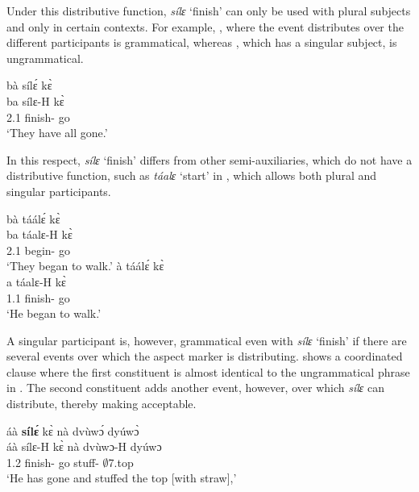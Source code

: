 Under this distributive function, {\itshape sílɛ} `finish' can only be used with plural subjects and only in certain contexts. For example, , where the event distributes over the different participants is grammatical, whereas , which has a singular subject, is ungrammatical.


\ea\label{Nsile1}
\ea  \label{Nsile11}
  \glll  bà sílɛ́ kɛ̀ \\
          ba sílɛ-H kɛ̀ \\
         2.{\PST}1 finish-{\R} go\\
    \trans `They have all gone.'
\z
\z

In this respect, {\itshape sílɛ} `finish' differs from other semi-auxiliaries, which do not have a distributive function, such as {\itshape táalɛ} `start' in , which allows both plural and singular participants.

\ea\label{taale}
\ea  \label{taale1}
  \glll  bà táálɛ́ kɛ̀ \\
          ba táalɛ-H kɛ̀ \\
         2.{\PST}1 begin-{\R} go\\
    \trans `They began to walk.'
\ex\label{taale2}
  \glll   à táálɛ́ kɛ̀\\
           a táalɛ-H kɛ̀\\
          1.{\PST}1 finish-{\R} go\\
    \trans `He began to walk.'
\z
\z


\noindent A singular participant is, however, grammatical even with {\itshape sílɛ} `finish'  if there are several events over which the aspect marker is distributing.  shows a coordinated clause where the first constituent is almost identical to the ungrammatical phrase in . The second constituent adds another event, however, over which {\itshape sílɛ} can distribute, thereby making  acceptable.

\ea\label{sile3}
  \glll áà {\bfseries sílɛ́} kɛ̀ nà dvùwɔ́ dyúwɔ̀\\
     áà sílɛ-H kɛ̀ nà dvùwɔ-H dyúwɔ \\
        1.{\PST}2 finish-{\R} go {\CONJ} stuff-{\R} $\emptyset$7.top\\
    \trans `He has gone and stuffed the top [with straw],'
\z

